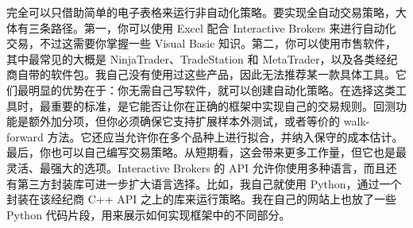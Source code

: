 \begin{chineseblock}完全可以只借助简单的电子表格来运行非自动化策略。要实现全自动交易策略，大体有三条路径。第一，你可以使用 Excel 配合 Interactive Brokers 来进行自动化交易，不过这需要你掌握一些 Visual Basic 知识。第二，你可以使用市售软件，其中最常见的大概是 NinjaTrader、TradeStation 和 MetaTrader，以及各类经纪商自带的软件包。我自己没有使用过这些产品，因此无法推荐某一款具体工具。它们最明显的优势在于：你无需自己写软件，就可以创建自动化策略。在选择这类工具时，最重要的标准，是它能否让你在正确的框架中实现自己的交易规则。回测功能是额外加分项，但你必须确保它支持扩展样本外测试，或者等价的 walk-forward 方法。它还应当允许你在多个品种上进行拟合，并纳入保守的成本估计。最后，你也可以自己编写交易策略。从短期看，这会带来更多工作量，但它也是最灵活、最强大的选项。Interactive Brokers 的 API 允许你使用多种语言，而且还有第三方封装库可进一步扩大语言选择。比如，我自己就使用 Python，通过一个封装在该经纪商 C++ API 之上的库来运行策略。我在自己的网站上也放了一些 Python 代码片段，用来展示如何实现框架中的不同部分。\end{chineseblock}

